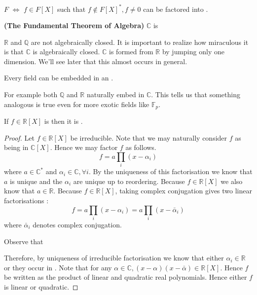 \documentclass{article}
\newcommand{\bfs}[1]{\textbf{({#1}) }}
\begin{document}
\begin{cora}\label{eq:doamdaxz}
 $F$  $\Longleftrightarrow$  $f \in F[X]$ such that $f \notin F[X]^{*}, f \neq 0$ can be factored into .
\end{cora}

\begin{thma}\bfs{The Fundamental Theorem of Algebra}\label{thm:oadmfc}
 $\mathbb{C}$ is 
\end{thma}
\begin{rema}
$\mathbb{R}$ and $\mathbb{Q}$ are not algebraically closed. It is important to realize how miraculous it is that $\mathbb{C}$ is algebraically closed. $\mathbb{C}$ is formed from $\mathbb{R}$ by jumping only one dimension. We'll see later that this almost  occurs in general.
\end{rema}
\begin{thma}\label{thm:ldaoc}
Every field can be embedded in an .
\end{thma}
\begin{exma}
For example both $\mathbb{Q}$ and $\mathbb{R}$ naturally embed in $\mathbb{C}$. This tells us that something analogous is true even for more exotic fields like $\mathbb{F}_{p}$.
\end{exma}

\begin{thma}
If $f \in \mathbb{R}[X]$ is  then it is .
\end{thma} 
\begin{proof}
 Let $f \in \mathbb{R}[X]$ be irreducible. Note that we may naturally consider $f$ as being in $\mathbb{C}[X]$. Hence we may factor $f$ as follows.
$$
f=a \prod_{i}\left(x-\alpha_{i}\right)
$$
where $a \in \mathbb{C}^{*}$ and $\alpha_{i} \in \mathbb{C}, \forall i$. By the uniqueness of this factorisation we know that $a$ is unique and the $\alpha_{i}$ are unique up to reordering. Because $f \in \mathbb{R}[X]$ we also know that $a \in \mathbb{R}$. Because $f \in \mathbb{R}[X]$, taking complex conjugation gives two linear factorisations :
$$
f=a \prod_{i}\left(x-\alpha_{i}\right)=a \prod_{i}\left(x-\bar{\alpha}_{i}\right)
$$
where $\bar{\alpha}_{i}$ denotes complex conjugation. 

Observe that  

Therefore, by uniqueness of irreducible factorisation we know that either $\alpha_{i} \in \mathbb{R}$ or they occur in . Note that for any $\alpha \in \mathbb{C},(x-\alpha)(x-\bar{\alpha}) \in \mathbb{R}[X]$. Hence $f$ be written as the product of linear and quadratic real polynomials. Hence either $f$ is linear or quadratic.
\end{proof}
\begin{cora}\label{cor:iqneda}
\end{cora}
\end{document}
